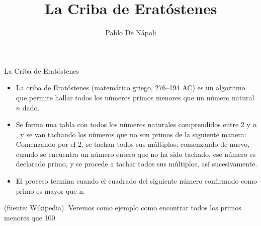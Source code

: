 \documentclass{beamer}
\begin{document}


\title{La Criba de Eratóstenes}
\author{Pablo De Nápoli}
\maketitle

\begin{frame}{La Criba de Eratóstenes}

 \begin{itemize}
 
 \item   La \alert{criba de Eratóstenes} (matemático griego, 276--194 AC) es un algoritmo que permite hallar todos los números primos menores que un 
 número natural $n$ dado. 
\item Se forma una tabla con todos los números naturales comprendidos entre 2 y $n$, 
 y se van tachando los números que no son primos de la siguiente manera: Comenzando por el 2, se tachan todos 
 sus múltiplos; comenzando de nuevo, cuando se encuentra un número entero que no ha sido tachado, ese número es 
 declarado \alert{primo}, y se procede a tachar todos sus múltiplos, así sucesivamente. 
 
\item El proceso termina cuando el cuadrado del siguiente número confirmado como primo es mayor que n.

\end{itemize}

(fuente: Wikipedia). Veremos como ejemplo como encontrar todos los primos menores que 100.

\end{frame}
\end{document}
